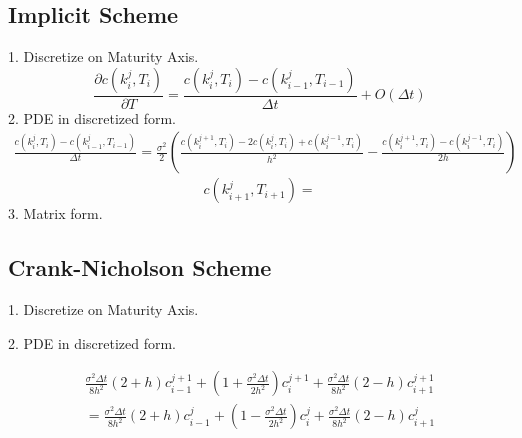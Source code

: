 \documentclass[12pt]{article}
\begin{document}
\subsection{Implicit Scheme}
1. Discretize on Maturity Axis.
\begin{equation}
    \frac{\partial c(k^j_i,T_i)}{\partial T}=\frac{c(k^j_{i},T_{i})-c(k^j_{i-1},T_{i-1})}{\Delta t}+O(\Delta t)
\end{equation}
2. PDE in discretized form.
\begin{equation}
\begin{split}
    \frac{c(k^j_{i},T_{i})-c(k^j_{i-1},T_{i-1})}{\Delta t}=\frac{\sigma^2}{2}\left(\frac{c(k^{j+1}_i,T_i)-2c(k^{j}_i,T_i)+c(k^{j-1}_i,T_i)}{h^2} - \frac{c(k^{j+1}_i,T_i)-c(k^{j-1}_i,T_i)}{2h} \right)
\end{split}
\end{equation}
\begin{equation}
    c(k^j_{i+1},T_{i+1})=
\end{equation}
3. Matrix form.

\subsection{Crank-Nicholson Scheme}
1. Discretize on Maturity Axis. \par
2. PDE in discretized form. \par
\begin{equation}
\begin{split}
    \frac{\sigma^2 \Delta t}{8h^2}(2+h)c^{j+1}_{i-1} + (1+ \frac{\sigma^2 \Delta t}{2h^2})c^{j+1}_{i} + \frac{\sigma^2 \Delta t}{8h^2}(2-h)c^{j+1}_{i+1} \\
    = \frac{\sigma^2 \Delta t}{8h^2}(2+h)c^{j}_{i-1} + (1- \frac{\sigma^2 \Delta t}{2h^2})c^{j}_{i} + \frac{\sigma^2 \Delta t}{8h^2}(2-h)c^{j}_{i+1}
\end{split}
\end{equation}
\end{document}

